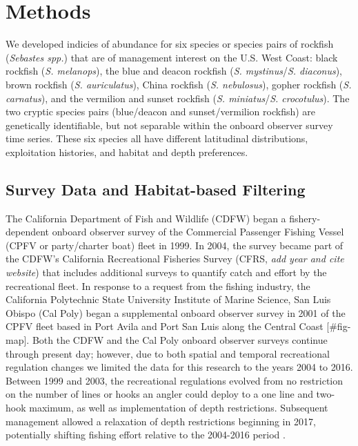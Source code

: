 \documentclass[
  12pt,
  authoryear,
  preprint,
  3p]{elsarticle}
\begin{document}
\hypertarget{methods}{%
\section{Methods}\label{methods}}

We developed indicies of abundance for six species or species pairs of
rockfish (\emph{Sebastes spp.}) that are of management interest on the
U.S. West Coast: black rockfish (\emph{S. melanops}), the blue and
deacon rockfish (\emph{S. mystinus}/\emph{S. diaconus}), brown rockfish
(\emph{S. auriculatus}), China rockfish (\emph{S. nebulosus}), gopher
rockfish (\emph{S. carnatus}), and the vermilion and sunset rockfish
(\emph{S. miniatus}/\emph{S. crocotulus}). The two cryptic species pairs
(blue/deacon and sunset/vermilion rockfish) are genetically
identifiable, but not separable within the onboard observer survey time
series. These six species all have different latitudinal distributions,
exploitation histories, and habitat and depth
preferences\citep{Love:2002:RNP}.

\hypertarget{survey-data-and-habitat-based-filtering}{%
\subsection{Survey Data and Habitat-based
Filtering}\label{survey-data-and-habitat-based-filtering}}

The California Department of Fish and Wildlife (CDFW) began a
fishery-dependent onboard observer survey of the Commercial Passenger
Fishing Vessel (CPFV or party/charter boat) fleet in 1999. In 2004, the
survey became part of the CDFW's California Recreational Fisheries
Survey (CFRS, \emph{add year and cite website}) that includes additional
surveys to quantify catch and effort by the recreational fleet. In
response to a request from the fishing industry, the California
Polytechnic State University Institute of Marine Science, San Luis
Obispo (Cal Poly) began a supplemental onboard observer survey in 2001
of the CPFV fleet based in Port Avila and Port San Luis along the
Central Coast {[}\#fig-map{]}. Both the CDFW and the Cal Poly onboard
observer surveys continue through present day; however, due to both
spatial and temporal recreational regulation changes we limited the data
for this research to the years 2004 to 2016. Between 1999 and 2003, the
recreational regulations evolved from no restriction on the number of
lines or hooks an angler could deploy to a one line and two-hook
maximum, as well as implementation of depth restrictions. Subsequent
management allowed a relaxation of depth restrictions beginning in 2017,
potentially shifting fishing effort relative to the 2004-2016 period
\citep{Monk:2021:SVR}.
\end{document}
